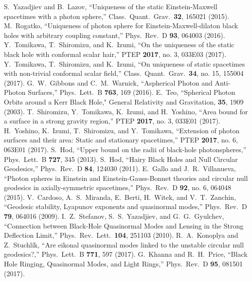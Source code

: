 \documentclass[twocolumn,showpacs,preprintnumbers,amsmath,amssymb,floatfix,nofootinbib]{revtex4-1}
\begin{document}
\begin{thebibliography}{99}
 S.~Yazadjiev and B.~Lazov, ``Uniqueness of the static Einstein-Maxwell spacetimes with a photon sphere,'' Class.\ Quant.\ Grav.\  {\bf 32}, 165021 (2015).
 M.~Rogatko, ``Uniqueness of photon sphere for Einstein-Maxwell-dilaton black holes with arbitrary coupling constant,'' Phys.\ Rev.\ D {\bf 93}, 064003 (2016).
 Y.~Tomikawa, T.~Shiromizu, and K.~Izumi, ``On the uniqueness of the static black hole with conformal scalar hair,'' PTEP {\bf 2017}, no. 3, 033E03 (2017).
 Y.~Tomikawa, T.~Shiromizu, and K.~Izumi, ``On uniqueness of static spacetimes with non-trivial conformal scalar field,'' Class.\ Quant.\ Grav.\  {\bf 34}, no. 15, 155004 (2017).
 G.~W.~Gibbons and C.~M.~Warnick, ``Aspherical Photon and Anti-Photon Surfaces,'' Phys.\ Lett.\ B {\bf 763}, 169 (2016).
 E.~Teo, ``Spherical Photon Orbits around a Kerr Black Hole," General Relativity and Gravitation, {\bf 35}, 1909 (2003).
 T.~Shiromizu, Y.~Tomikawa, K.~Izumi, and H.~Yoshino, ``Area bound for a surface in a strong gravity region,'' PTEP {\bf 2017}, no. 3, 033E01 (2017).
 H.~Yoshino, K.~Izumi, T.~Shiromizu, and Y.~Tomikawa, ``Extension of photon surfaces and their area: Static and stationary spacetimes,'' PTEP {\bf 2017}, no. 6, 063E01 (2017).
 S.~Hod, ``Upper bound on the radii of black-hole photonspheres,'' Phys.\ Lett.\ B {\bf 727}, 345 (2013).
 S.~Hod, ``Hairy Black Holes and Null Circular Geodesics,'' Phys.\ Rev.\ D {\bf 84}, 124030 (2011).
 E.~Gallo and J.~R.~Villanueva, ``Photon spheres in Einstein and Einstein-Gauss-Bonnet theories and circular null geodesics in axially-symmetric spacetimes,'' Phys.\ Rev.\ D {\bf 92}, no. 6, 064048 (2015).
 V.~Cardoso, A.~S.~Miranda, E.~Berti, H.~Witek, and V.~T.~Zanchin, ``Geodesic stability, Lyapunov exponents and quasinormal modes,'' Phys.\ Rev.\ D {\bf 79}, 064016 (2009).
 I.~Z.~Stefanov, S.~S.~Yazadjiev, and G.~G.~Gyulchev, ``Connection between Black-Hole Quasinormal Modes and Lensing in the Strong Deflection Limit,'' Phys.\ Rev.\ Lett.\  {\bf 104}, 251103 (2010).
 R.~A.~Konoplya and Z.~Stuchl\'ik, ``Are eikonal quasinormal modes linked to the unstable circular null geodesics?,'' Phys.\ Lett.\ B {\bf 771}, 597 (2017).
 G.~Khanna and R.~H.~Price, ``Black Hole Ringing, Quasinormal Modes, and Light Rings,'' Phys.\ Rev.\ D {\bf 95}, 081501 (2017).

\end{thebibliography}
\end{document}
